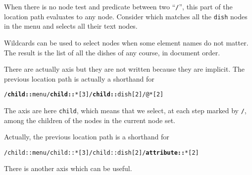 %
\begin{slide}
 
\raggedslides[0pt]

When there is no node test and predicate between two ``\verb|/|'', this
part of the location path evaluates to any node. Consider
which matches all the \texttt{dish} nodes in the menu and selects all
their text nodes. 

\end{slide}


%
\begin{slide}

\raggedslides[0pt]

Wildcards can be used to select nodes when some element names do not
matter.   
The result is the list of all the dishes of any course, in document
order.

\end{slide}


%
\begin{slide}

\raggedslides[0pt]


There are actually axis but they are not written because they are
implicit. The previous location path is actually a shorthand for
\begin{alltt}
/\textbf{child::}menu/\textbf{child::}*[3]/\textbf{child::}dish[2]/@*[2]
\end{alltt}
The axis are here \verb|child|, which means that we select, at each
step marked by \verb|/|, among the children of the nodes in the
current node set.

\end{slide}

%
\begin{slide}

\raggedslides[0pt]

Actually, the previous location path is a shorthand for
\begin{alltt}
/child::menu/child::*[3]/child::dish[2]/\textbf{attribute::}*[2]
\end{alltt}
There is another axis which can be useful. 

\end{slide}


